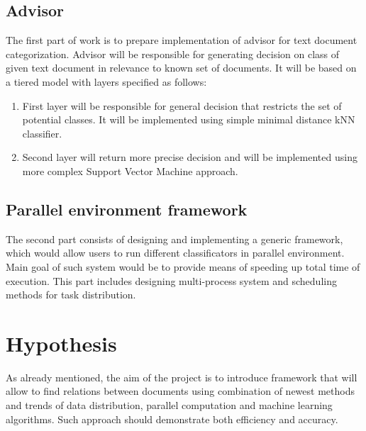 \subsection{Advisor}
The first part of work is to prepare implementation of advisor for text document categorization. Advisor will be responsible for generating decision on class of given text document in relevance to known set of documents. It will be based on a tiered model with layers specified as follows:
\begin{enumerate}
\item First layer will be responsible for general decision that restricts the set of potential classes. It will be implemented using simple minimal distance kNN classifier.
\item Second layer will return more precise decision and will be implemented using more complex Support Vector Machine approach.
\end{enumerate}
	
\subsection{Parallel environment framework}
The second part consists of designing and implementing a generic framework, which would allow users to run different classificators in parallel environment. Main goal of such system would be to provide means of speeding up total time of execution. This part includes designing multi-process system and scheduling methods for task distribution. 

\section{Hypothesis}
\label{hypo}
As already mentioned, the aim of the project is to introduce framework that will allow to find relations between documents using combination of newest methods and trends of data distribution, parallel computation and machine learning algorithms. Such approach should demonstrate both efficiency and accuracy.

